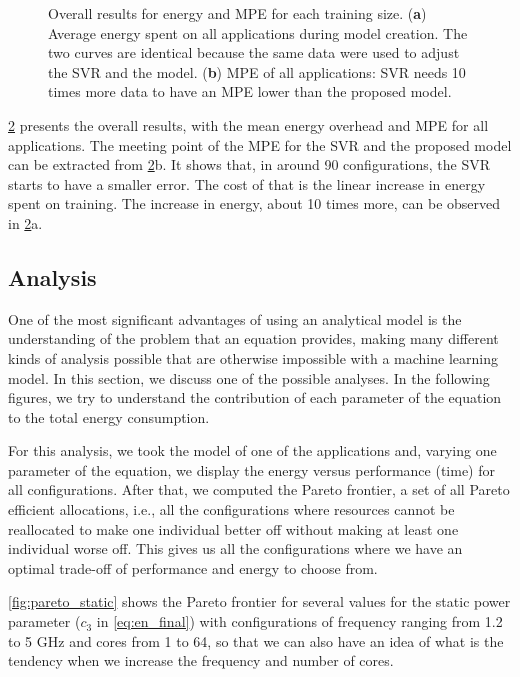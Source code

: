 \begin{figure}[H]
\begin{subfigure}[t]{0.45\textwidth}
		\caption{
		}
		\label{fig:overall_MPE}
	\end{subfigure}
	\caption{Overall results for energy and MPE for each training size. (\textbf{a}) Average energy spent on all applications during model creation. The two curves are identical because the same data were used to adjust the SVR and the model. (\textbf{b}) MPE of all applications: SVR needs 10 times more data to have an MPE lower than the proposed model.}
	\label{fig:overall_train}
\end{figure}

\cref{fig:overall_train} presents the overall results, with the mean energy overhead and MPE for all applications.
The meeting point of the MPE for the SVR and the proposed model can be extracted from \cref{fig:overall_train}b.
It shows that, in around 90 configurations, the SVR starts to have a smaller error. The cost of that is the linear increase in energy spent on training. The increase in energy, about 10 times more, can be observed in \cref{fig:overall_train}a.

\subsection{Analysis}
One of the most significant advantages of using an analytical model is the understanding of the problem that an equation provides, making many different kinds of analysis possible that are otherwise impossible with a machine learning model. In this section, we discuss one of the possible analyses. In the following figures, we try to understand the contribution of each parameter of the equation to the total energy consumption.

For this analysis, we took the model of one of the applications and, varying one parameter of the equation, we display the energy versus performance (time) for all configurations. After that, we computed the Pareto frontier, a set of all Pareto efficient allocations, i.e., all the configurations where resources cannot be reallocated to make one individual better off without making at least one individual worse off. This gives us all the configurations where we have an optimal trade-off of performance and energy to choose from.


\cref{fig:pareto_static} shows the Pareto frontier for several values for the static power parameter ($c_3$ in \cref{eq:en_final}) with configurations of frequency ranging from 1.2 to 5 GHz and cores from 1 to 64, so that we can also have an idea of what is the tendency when we increase the frequency and number of cores.

